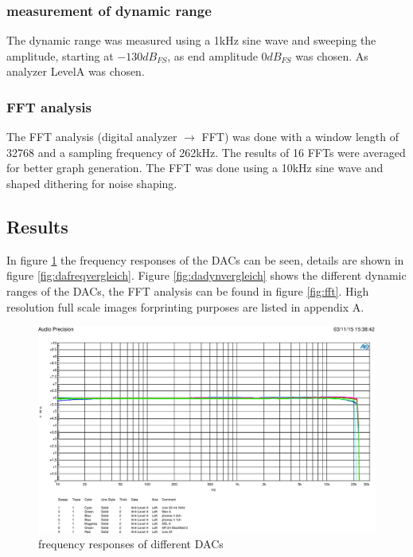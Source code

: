 \documentclass[11pt]{report}
\begin{document}
\subsubsection{measurement of dynamic range}
The dynamic range was measured using a 1kHz sine wave and sweeping the amplitude, starting at $-130dB_{FS}$, as end amplitude $0dB_{FS}$ was chosen. As analyzer LevelA was chosen.
\subsubsection{FFT analysis}
The FFT analysis (digital analyzer $\rightarrow$ FFT) was done with a window length of 32768 and a sampling frequency of 262kHz. The results of 16 FFTs were averaged for better graph generation. The FFT was done using a 10kHz sine wave and shaped dithering for noise shaping.

	\subsection{Results}
In figure \ref{fig:da10} the frequency responses of the DACs can be seen, details are shown in figure \ref{fig:dafreqvergleich}. Figure \ref{fig:dadynvergleich} shows the different dynamic ranges of the DACs, the FFT analysis can be found in figure \ref{fig:fft}. High resolution full scale images forprinting purposes are listed in appendix A.

\begin{figure}[htbp]
\begin{center}
\includegraphics[width=14cm,keepaspectratio=true]{DAWandlerVergleich10dB}
\caption{frequency responses of different DACs}
\label{fig:da10}
\end{center}
\end{figure}
\end{document}
